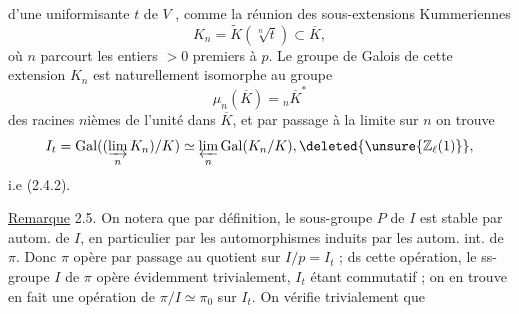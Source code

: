 d'une uniformisante   \(t\) de \(V\) , comme la réunion des sous-extensions  Kummeriennes
\[
K_n=\widetilde K(\sqrt[n]{t})\subset\overline K,\tag*{(2.4.4)}
\]
où \(n\) parcourt les entiers \(>0\) premiers à \(p\). Le groupe de Galois de cette extension \(K_n\) est naturellement isomorphe au groupe
\[
\mu_n(\overline K)={}_n\overline K^*
\]
des racines \(n\)ièmes de l'unité dans \(\overline K\), et par passage à la limite sur \(n\) on trouve
\[
I_t=\operatorname{Gal}((\varinjlim_n K_n)/K)\simeq\varprojlim_n\operatorname{Gal}(K_n/K),\deleted{\unsure{\mathbb Z_\ell(1)}},
\]
i.e (2.4.2).

\uline{Remarque} 2.5. On notera que par définition, le sous-groupe \(P\) de \(I\) est stable par \uline{} autom. de \(I\), en particulier par les automorphismes induits par les autom. int. de \(\pi\). Donc \(\pi\) opère par passage au quotient sur \(I/p=I_t\) ;   ds cette opération, le ss-groupe \(I\) de \(\pi\) opère évidemment trivialement, \(I_t\) étant commutatif ; on en trouve en fait une opération de \(\pi/I\simeq\pi_0\) sur \(I_t\).  On vérifie trivialement que
